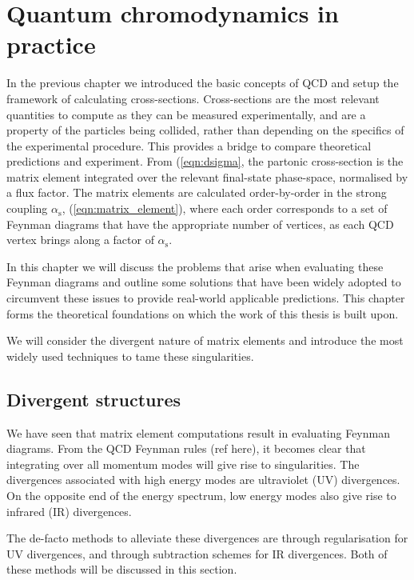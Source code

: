 \documentclass[main.tex]{subfiles}
\begin{document}
\chapter{Quantum chromodynamics in practice}
\label{chapter:qcd}
    In the previous chapter we introduced the basic concepts
    of QCD and setup the framework of calculating
    cross-sections. Cross-sections are the most relevant
    quantities to compute as they can be measured
    experimentally, and are a property of the particles
    being collided, rather than depending on the
    specifics of the experimental procedure.
    This provides a bridge to compare
    theoretical predictions and experiment.
    From (\ref{eqn:dsigma}, the partonic cross-section
    is the matrix element integrated over the relevant
    final-state phase-space, normalised by a flux factor.
    The matrix elements are
    calculated order-by-order in the strong coupling
    $\alpha_{\mathrm{s}}$, (\ref{eqn:matrix_element}),
    where each order corresponds to a set of Feynman diagrams
    that have the appropriate number of vertices,
    as each QCD vertex brings along a factor of $\alpha_{\mathrm{s}}$.

    In this chapter we will discuss the problems that
    arise when evaluating these Feynman diagrams and outline
    some solutions that have been widely adopted to circumvent
    these issues to provide real-world applicable predictions.
    This chapter forms the theoretical foundations on which
    the work of this thesis is built upon.

    We will consider the divergent nature of matrix
    elements and introduce the most widely used techniques
    to tame these singularities.

\section{Divergent structures}
    We have seen that matrix element computations
    result in evaluating Feynman diagrams. From
    the QCD Feynman rules (ref here), it becomes
    clear that integrating over all momentum modes
    will give rise to singularities. The divergences
    associated with high energy modes are ultraviolet
    (UV) divergences. On the opposite end of the energy
    spectrum, low energy modes also give rise to 
    infrared (IR) divergences.

    The de-facto methods to alleviate these
    divergences are through regularisation
    for UV divergences, and through subtraction
    schemes for IR divergences. Both of these
    methods will be discussed in this section.
\end{document}
